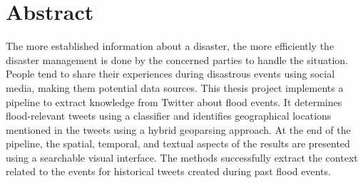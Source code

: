 \section*{Abstract}

The more established information about a disaster, the more efficiently the disaster management is
done by the concerned parties to handle the situation. People tend to share their experiences during
disastrous events using social media, making them potential data sources. This thesis project
implements a pipeline to extract knowledge from Twitter about flood events. It determines
flood-relevant tweets using a classifier and identifies geographical locations mentioned in the
tweets using a hybrid geoparsing approach. At the end of the pipeline, the spatial, temporal, and
textual aspects of the results are presented using a searchable visual interface. The methods
successfully extract the context related to the events for historical tweets created during past
flood events.


